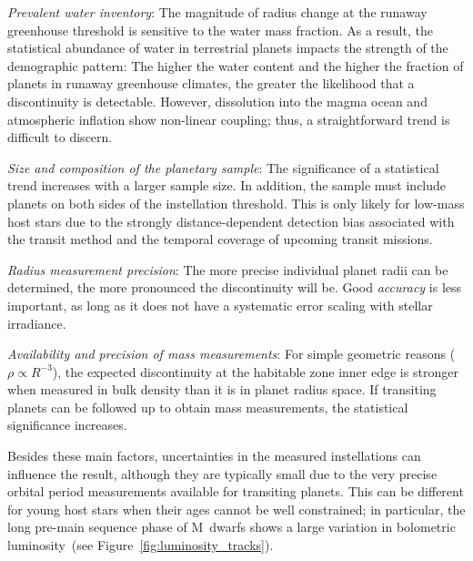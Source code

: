 \documentclass[twocolumn,twocolappendix]{aastex631}
\begin{document}
\textit{Prevalent water inventory}: The magnitude of radius change at the runaway greenhouse threshold is sensitive to the water mass fraction.
As a result, the statistical abundance of water in terrestrial planets impacts the strength of the demographic pattern:
The higher the water content and the higher the fraction of planets in runaway greenhouse climates, the greater the likelihood that a discontinuity is detectable.
However, dissolution into the magma ocean and atmospheric inflation show non-linear coupling; thus, a straightforward trend is difficult to discern.

\textit{Size and composition of the planetary sample}: The significance of a statistical trend increases with a larger sample size.
In addition, the sample must include planets on both sides of the instellation threshold.
This is only likely for low-mass host stars due to the strongly distance-dependent detection bias associated with the transit method and the temporal coverage of upcoming transit missions.

\textit{Radius measurement precision}: The more precise individual planet radii can be determined, the more pronounced the discontinuity will be.
Good \textit{accuracy} is less important, as long as it does not have a systematic error scaling with stellar irradiance.

\textit{Availability and precision of mass measurements}: For simple geometric reasons ($\rho \propto R^{-3}$), the expected discontinuity at the habitable zone inner edge is stronger when measured in bulk density than it is in planet radius space.
If transiting planets can be followed up to obtain mass measurements, the statistical significance increases.

Besides these main factors, uncertainties in the measured instellations can influence the result, although they are typically small due to the very precise orbital period measurements available for transiting planets.
This can be different for young host stars when their ages cannot be well constrained; in particular, the long pre-main sequence phase of M~dwarfs shows a large variation in bolometric luminosity~(see Figure~\ref{fig:luminosity_tracks}).
\end{document}

